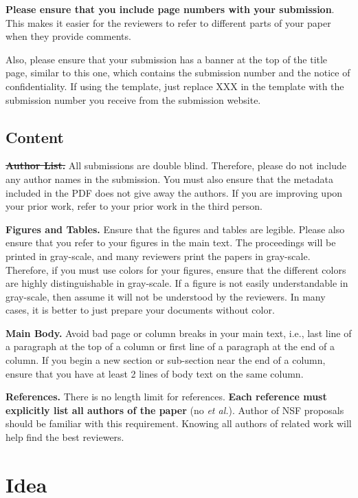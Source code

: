 \documentclass[pageno]{jpaper}
\begin{document}
\textbf{Please ensure that you include page numbers with your
submission}. This makes it easier for the reviewers to refer to
different parts of your paper when they provide comments.

Also, please ensure that your submission has a banner at the top of 
the title page, similar to this one, which contains the submission
number and the notice of confidentiality.  If using the template,
just replace XXX in the template with the submission number
you receive from the submission website.

\subsection{Content}

\noindent\textbf{\sout{Author List.}} All submissions are double
blind. Therefore, please do not include any author names in the
submission. You must also ensure that the metadata included in the
PDF does not give away the authors. If you are improving upon your
prior work, refer to your prior work in the third person.

\noindent\textbf{Figures and Tables.} Ensure that the figures and
tables are legible.  Please also ensure that you refer to your
figures in the main text. The proceedings will be printed in
gray-scale, and many reviewers print the papers in
gray-scale. Therefore, if you must use colors for your figures, ensure
that the different colors are highly distinguishable in gray-scale.
If a figure is not easily understandable in gray-scale, then assume
it will not be understood by the reviewers.  In many cases, it
is better to just prepare your documents without color.

\noindent\textbf{Main Body.} Avoid bad page or column breaks in
your main text, i.e., last line of a paragraph at the top of a
column or first line of a paragraph at the end of a column. If you
begin a new section or sub-section near the end of a column,
ensure that you have at least 2 lines of body text on the same
column. 

\noindent\textbf{References.} There is no length limit for references.  {\bf Each reference must explicitly list all authors of the paper} (no {\it et al.}).  Author of NSF proposals should be familiar with this requirement.  Knowing all authors of related work will help find the best reviewers. 

\section{Idea}
\end{document}
